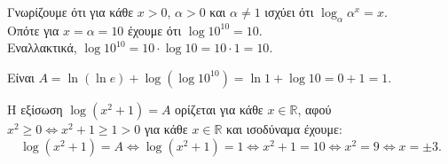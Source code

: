 \begin{alist}
\item 
\begin{rlist}
\item Γνωρίζουμε ότι για κάθε $x > 0$, $\alpha > 0$ και $\alpha \neq 1$ ισχύει ότι $\log_\alpha \alpha^x = x$. \\
Οπότε για $x = \alpha = 10$ έχουμε ότι $\log 10^{10} = 10$. \\
Εναλλακτικά, $\log 10^{10} = 10 \cdot \log 10 = 10 \cdot 1 = 10$.
\item Είναι $A = \ln(\ln e) + \log(\log 10^{10}) = \ln 1 + \log 10 = 0 + 1 = 1$.
\end{rlist}
\item Η εξίσωση $\log(x^2 + 1) = A$ ορίζεται για κάθε $x \in \mathbb{R}$, αφού $x^2 \ge 0 \Leftrightarrow x^2 + 1 \ge 1 > 0$ για κάθε $x \in \mathbb{R}$ και ισοδύναμα έχουμε:
\[\log(x^2 + 1) = A \Leftrightarrow \log(x^2 + 1) = 1 \Leftrightarrow x^2 + 1 = 10 \Leftrightarrow x^2 = 9 \Leftrightarrow x = \pm 3.\]
\end{alist}

